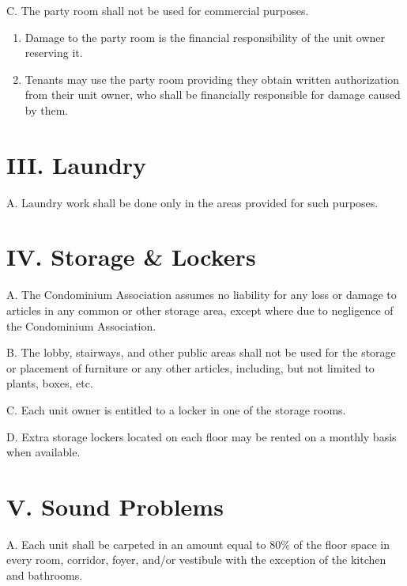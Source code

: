 \documentclass[
]{book}
\begin{document}
C. The party room shall not be used for commercial purposes.

\begin{enumerate}
\def\labelenumi{\arabic{enumi}.}
\item
  Damage to the party room is the financial responsibility of the unit owner reserving it.
\item
  Tenants may use the party room providing they obtain written authorization from their unit owner, who shall be financially responsible for damage caused by them.
\end{enumerate}

\hypertarget{iii.-laundry}{%
\section*{III. Laundry}\label{iii.-laundry}}

A. Laundry work shall be done only in the areas provided for such purposes.

\hypertarget{iv.-storage-lockers}{%
\section*{IV. Storage \& Lockers}\label{iv.-storage-lockers}}

A. The Condominium Association assumes no liability for any loss or damage to articles in any common or other storage area, except where due to negligence of the Condominium Association.

B. The lobby, stairways, and other public areas shall not be used for the storage or placement of furniture or any other articles, including, but not limited to plants, boxes, etc.

C. Each unit owner is entitled to a locker in one of the storage rooms.

D. Extra storage lockers located on each floor may be rented on a monthly basis when available.

\hypertarget{v.-sound-problems}{%
\section*{V. Sound Problems}\label{v.-sound-problems}}

A. Each unit shall be carpeted in an amount equal to 80\% of the floor space in every room, corridor, foyer, and/or vestibule with the exception of the kitchen and bathrooms.
\end{document}
